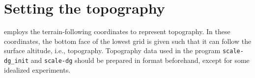 \section{Setting the topography} \label{subsec:basic_usel_topo}

\scaledg employs the terrain-following coordinates to represent topography.
In these coordinates, 
the bottom face of the lowest grid is given such that it can follow the surface altitude, i.e., topography.
Topography data used in the program \verb|scale-dg_init| and \verb|scale-dg| should be prepared in \scalelib format beforehand, except for some idealized experiments.

